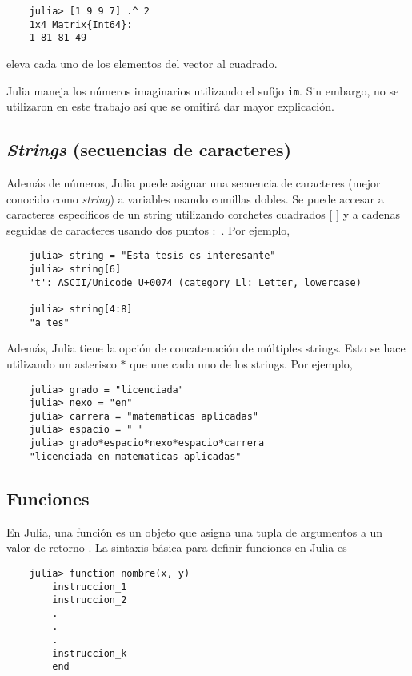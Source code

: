 \begin{verbatim}
	julia> [1 9 9 7] .^ 2
	1x4 Matrix{Int64}:
	1 81 81 49
\end{verbatim}

 \noindent eleva cada uno de los elementos del vector al cuadrado. 

\textsf{Julia} maneja los números imaginarios utilizando el sufijo \texttt{im}. Sin embargo, no se utilizaron en este trabajo así que se omitirá dar mayor explicación. 

\subsection{\textit{Strings} (secuencias de caracteres)} 

Además de números, \textsf{Julia} puede asignar una secuencia de caracteres (mejor conocido como \textit{string}) a variables usando comillas dobles. Se puede accesar a caracteres específicos de un string utilizando corchetes cuadrados $[$ $]$ y a cadenas seguidas de caracteres usando dos puntos $:$ . Por ejemplo,

\begin{verbatim}
    julia> string = "Esta tesis es interesante"
    julia> string[6]
    't': ASCII/Unicode U+0074 (category Ll: Letter, lowercase)
    
    julia> string[4:8]
    "a tes"
\end{verbatim}

Además, \textsf{Julia} tiene la opción de concatenación de múltiples strings. Esto se hace utilizando un asterisco $*$ que une cada uno de los strings. Por ejemplo,

\begin{verbatim}
	julia> grado = "licenciada"
	julia> nexo = "en"
	julia> carrera = "matematicas aplicadas"
	julia> espacio = " "
	julia> grado*espacio*nexo*espacio*carrera
	"licenciada en matematicas aplicadas"
\end{verbatim}

\subsection{Funciones} \label{funciones_subsection}
En \textsf{Julia}, una función es un objeto que asigna una tupla de argumentos a un valor de retorno \citep{manual_Julia}. La sintaxis básica para definir funciones en \textsf{Julia} es 

\begin{verbatim}
	julia> function nombre(x, y)
		instruccion_1
		instruccion_2 
		.
		.
		.
		instruccion_k
    	end
\end{verbatim}

